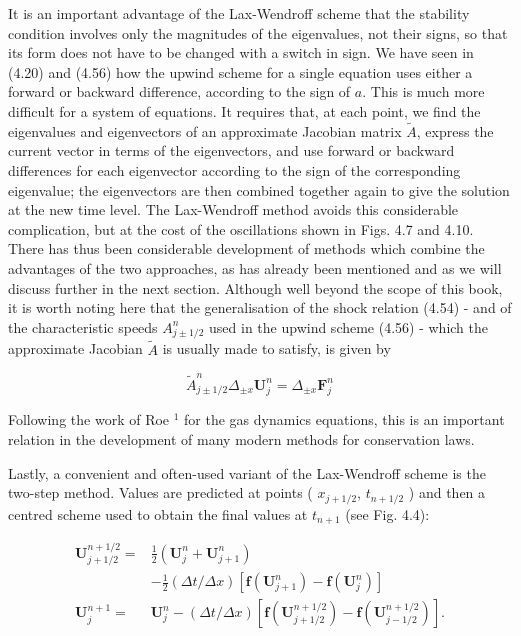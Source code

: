 \documentclass[10pt]{article}
\begin{document}
It is an important advantage of the Lax-Wendroff scheme that the stability condition involves only the magnitudes of the eigenvalues, not their signs, so that its form does not have to be changed with a switch in sign. We have seen in (4.20) and (4.56) how the upwind scheme for a single equation uses either a forward or backward difference, according to the sign of \(a\). This is much more difficult for a system of equations. It requires that, at each point, we find the eigenvalues and eigenvectors of an approximate Jacobian matrix \(\tilde{A}\), express the current vector in terms of the eigenvectors, and use forward or backward differences for each eigenvector according to the sign of the corresponding eigenvalue; the eigenvectors are then combined together again to give the solution at the new time level. The Lax-Wendroff method avoids this considerable\\
complication, but at the cost of the oscillations shown in Figs. 4.7 and 4.10. There has thus been considerable development of methods which combine the advantages of the two approaches, as has already been mentioned and as we will discuss further in the next section. Although well beyond the scope of this book, it is worth noting here that the generalisation of the shock relation (4.54) - and of the characteristic speeds \(A_{j \pm 1 / 2}^{n}\) used in the upwind scheme (4.56) - which the approximate Jacobian \(\tilde{A}\) is usually made to satisfy, is given by

\[
\tilde{A}_{j \pm 1 / 2}^{n} \Delta_{ \pm x} \mathbf{U}_{j}^{n}=\Delta_{ \pm x} \mathbf{F}_{j}^{n}
\]

Following the work of Roe \({ }^{1}\) for the gas dynamics equations, this is an important relation in the development of many modern methods for conservation laws.

Lastly, a convenient and often-used variant of the Lax-Wendroff scheme is the two-step method. Values are predicted at points ( \(x_{j+1 / 2}\), \(t_{n+1 / 2}\) ) and then a centred scheme used to obtain the final values at \(t_{n+1}\) (see Fig. 4.4):

\[
\begin{aligned}
\mathbf{U}_{j+1 / 2}^{n+1 / 2}= & \frac{1}{2}\left(\mathbf{U}_{j}^{n}+\mathbf{U}_{j+1}^{n}\right) \\
& -\frac{1}{2}(\Delta t / \Delta x)\left[\mathbf{f}\left(\mathbf{U}_{j+1}^{n}\right)-\mathbf{f}\left(\mathbf{U}_{j}^{n}\right)\right] \\
\mathbf{U}_{j}^{n+1}= & \mathbf{U}_{j}^{n}-(\Delta t / \Delta x)\left[\mathbf{f}\left(\mathbf{U}_{j+1 / 2}^{n+1 / 2}\right)-\mathbf{f}\left(\mathbf{U}_{j-1 / 2}^{n+1 / 2}\right)\right] .
\end{aligned}
\]
\end{document}
